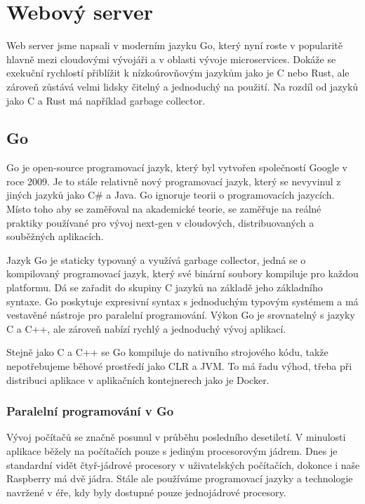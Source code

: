 \documentclass[12pt,a4paper]{article}
\begin{document}
\section{Webový server}

Web server jsme napsali v moderním jazyku Go, který nyní roste v popularitě
hlavně mezi cloudovými vývojáři a v oblasti vývoje microservices. Dokáže se
exekuční rychlostí přiblížit k nízkoúrovňovým jazykům jako je C nebo Rust, ale
zároveň zůstává velmi lidsky čitelný a jednoduchý na použití. Na rozdíl od
jazyků jako C a Rust má například garbage collector.

\subsection{Go}

Go je open-source programovací jazyk, který byl vytvořen společností Google v
roce 2009. Je to stále relativně nový programovací jazyk, který se nevyvinul z
jiných jazyků jako C\# a Java. Go ignoruje teorii o programovacích jazycích.
Místo toho aby se zaměřoval na akademické teorie, se zaměřuje na reálné
praktiky používané pro vývoj next-gen v cloudových, distribuovaných a
souběžných aplikacích.

Jazyk Go je staticky typovaný a využívá garbage collector, jedná se o
kompilovaný programovací jazyk, který své binární soubory kompiluje pro každou
platformu. Dá se zařadit do skupiny C jazyků na základě jeho základního
syntaxe. Go poskytuje expresivní syntax s jednoduchým typovým systémem a má
vestavěné nástroje pro paralelní programování. Výkon Go je srovnatelný s jazyky
C a C++, ale zároveň nabízí rychlý a jednoduchý vývoj aplikací.

Stejně jako C a C++ se Go kompiluje do nativního strojového kódu, takže
nepotřebujeme běhové prostředí jako CLR a JVM. To má řadu výhod, třeba při
distribuci aplikace v aplikačních kontejnerech jako je Docker.

\subsubsection{Paralelní programování v Go}

Vývoj počítačů se značně posunul v průběhu posledního desetiletí. V minulosti
aplikace běžely na počítačích pouze s jediným procesorovým jádrem. Dnes je
standardní vidět čtyř-jádrové procesory v uživatelských počítačích, dokonce i
naše Raspberry má dvě jádra. Stále ale používáme programovací jazyky a
technologie navržené v éře, kdy byly dostupné pouze jednojádrové procesory.
\end{document}
